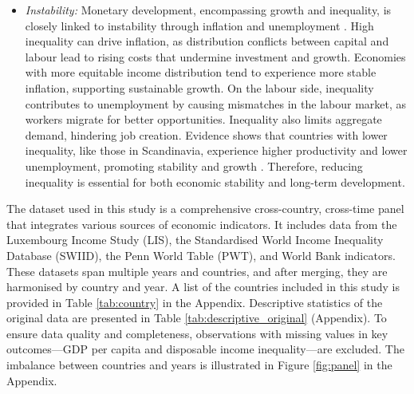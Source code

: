\documentclass[12pt]{article}
\begin{document}
\begin{itemize}
    \item \textit{Instability:} Monetary development, encompassing growth and inequality, is closely linked to instability through inflation and unemployment \parencite{rolim2024inflation}. High inequality can drive inflation, as distribution conflicts between capital and labour lead to rising costs that undermine investment and growth. Economies with more equitable income distribution tend to experience more stable inflation, supporting sustainable growth. On the labour side, inequality contributes to unemployment by causing mismatches in the labour market, as workers migrate for better opportunities. Inequality also limits aggregate demand, hindering job creation. Evidence shows that countries with lower inequality, like those in Scandinavia, experience higher productivity and lower unemployment, promoting stability and growth \parencite{galbraith2016inequality}. Therefore, reducing inequality is essential for both economic stability and long-term development.
\end{itemize}

The dataset used in this study is a comprehensive cross-country, cross-time panel that integrates various sources of economic indicators. It includes data from the Luxembourg Income Study (LIS), the Standardised World Income Inequality Database (SWIID), the Penn World Table (PWT), and World Bank indicators. These datasets span multiple years and countries, and after merging, they are harmonised by country and year. A list of the countries included in this study is provided in Table \ref{tab:country} in the Appendix. Descriptive statistics of the original data are presented in Table \ref{tab:descriptive_original} (Appendix). To ensure data quality and completeness, observations with missing values in key outcomes—GDP per capita and disposable income inequality—are excluded. The imbalance between countries and years is illustrated in Figure \ref{fig:panel} in the Appendix.


\end{document}
